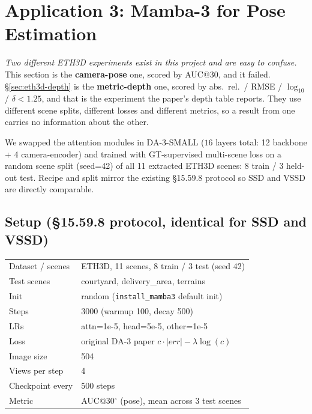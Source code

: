 \documentclass[11pt,a4paper]{article}
\begin{document}
\section{Application 3: Mamba-3 for Pose Estimation}
\label{sec:eth3d}

\emph{Two different ETH3D experiments exist in this project and are easy to
confuse.} This section is the \textbf{camera-pose} one, scored by
AUC@30\textdegree, and it failed. \S\ref{sec:eth3d-depth} is the
\textbf{metric-depth} one, scored by abs.\ rel.\ / RMSE / $\log_{10}$ /
$\delta{<}1.25$, and that is the experiment the paper's depth table reports.
They use different scene splits, different losses and different metrics, so a
result from one carries no information about the other.

We swapped the attention modules in DA-3-SMALL ($16$ layers total: 12
backbone + 4 camera-encoder) and trained with GT-supervised
multi-scene loss on a random scene split (seed=42) of all 11 extracted
ETH3D scenes: 8 train / 3 held-out test. Recipe and split mirror the
existing \S15.59.8 protocol so SSD and VSSD are directly comparable.

\subsection{Setup (\texorpdfstring{\S}{Sec.}15.59.8 protocol, identical for SSD and VSSD)}

\begin{center}
\begin{tabular}{ll}
\toprule
Dataset / scenes      & ETH3D, 11 scenes, 8 train / 3 test (seed 42) \\
Test scenes           & courtyard, delivery\_area, terrains \\
Init                  & random (\texttt{install\_mamba3} default init) \\
Steps                 & 3000 (warmup 100, decay 500) \\
LRs                   & attn=1e-5, head=5e-5, other=1e-5 \\
Loss                  & original DA-3 paper $c\cdot|err| - \lambda\log(c)$ \\
Image size            & 504 \\
Views per step        & 4 \\
Checkpoint every      & 500 steps \\
Metric                & AUC@30$^\circ$ (pose), mean across 3 test scenes \\
\bottomrule
\end{tabular}
\end{center}
\end{document}
